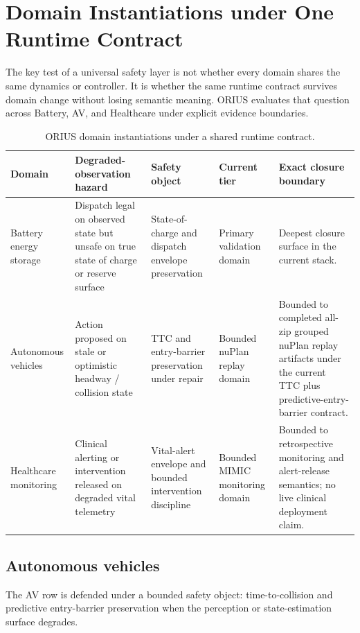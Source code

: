 \section{Domain Instantiations under One Runtime Contract}
\label{sec:ieee-domains}

The key test of a universal safety layer is not whether every domain shares the same
dynamics or controller. It is whether the same runtime contract survives domain change
without losing semantic meaning. ORIUS evaluates that question across Battery, AV, and
Healthcare under explicit evidence boundaries.

\begin{table}[t]
\centering
\caption{ORIUS domain instantiations under a shared runtime contract.}
\label{tab:ieee-domain-rows}
\small
\begin{tabularx}{\textwidth}{@{}p{}p{}p{}p{}X@{}}
\toprule
\textbf{Domain} & \textbf{Degraded-observation hazard} & \textbf{Safety object} & \textbf{Current tier} & \textbf{Exact closure boundary}\\
\midrule
Battery energy storage & Dispatch legal on observed state but unsafe on true state of charge or reserve surface & State-of-charge and dispatch envelope preservation & Primary validation domain & Deepest closure surface in the current stack.\\
Autonomous vehicles & Action proposed on stale or optimistic headway / collision state & TTC and entry-barrier preservation under repair & Bounded nuPlan replay domain & Bounded to completed all-zip grouped nuPlan replay artifacts under the current TTC plus predictive-entry-barrier contract.\\
Healthcare monitoring & Clinical alerting or intervention released on degraded vital telemetry & Vital-alert envelope and bounded intervention discipline & Bounded MIMIC monitoring domain & Bounded to retrospective monitoring and alert-release semantics; no live clinical deployment claim.\\
\bottomrule
\end{tabularx}
\end{table}

\subsection{Autonomous vehicles}
The AV row is defended under a bounded safety object: time-to-collision and predictive
entry-barrier preservation when the perception or state-estimation surface degrades.

